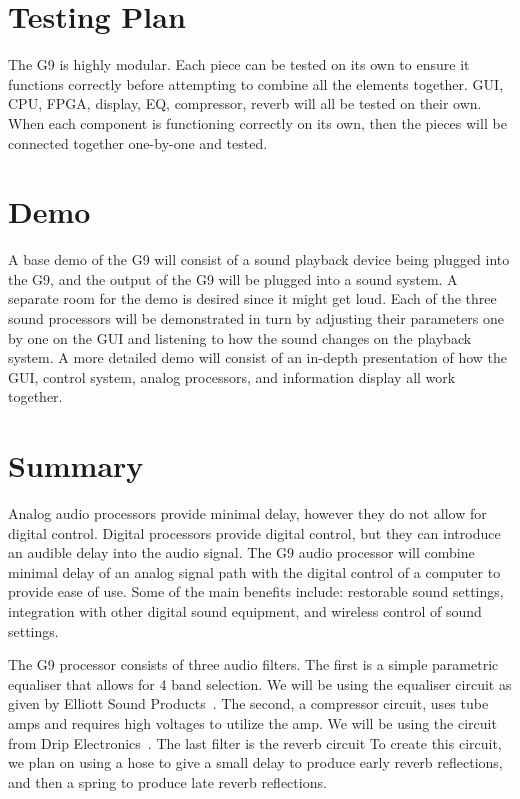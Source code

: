 \documentclass[journal]{IEEEtran}
\begin{document}
	
	\section{Testing Plan}
	The G9 is highly modular. Each piece can be tested on its own to ensure it functions correctly before attempting to combine all the elements together. GUI, CPU, FPGA, display, EQ, compressor, reverb will all be tested on their own. When each component is functioning correctly on its own, then the pieces will be connected together one-by-one and tested.
	
	\section{Demo}
	A base demo of the G9 will consist of a sound playback device being plugged into the G9, and the output of the G9 will be plugged into a sound system. A separate room for the demo is desired since it might get loud. Each of the three sound processors will be demonstrated in turn by adjusting their parameters one by one on the GUI and listening to how the sound changes on the playback system. A more detailed demo will consist of an in-depth presentation of how the GUI, control system, analog processors, and information display all work together.
	
	
	\section{Summary}
	Analog audio processors provide minimal delay, however they do not allow for digital control.  Digital processors provide digital control, but they can introduce an audible delay into the audio signal.  The G9 audio processor will combine minimal delay of an analog signal path with the digital control of a computer to provide ease of use.  Some of the main benefits include: restorable sound settings, integration with other digital sound equipment, and wireless control of sound settings.
	
	The G9 processor consists of three audio filters. The first is a simple parametric equaliser that allows for 4 band selection.  We will be using the equaliser circuit as given by Elliott Sound Products~\cite{espEq}.  The second, a compressor circuit, uses tube amps and requires high voltages to utilize the amp.  We will be using the circuit from Drip Electronics~\cite{opto7}. The last filter is the reverb circuit  To create this circuit, we plan on using a hose to give a small delay to produce early reverb reflections, and then a spring to produce late reverb reflections.
	
\end{document}
